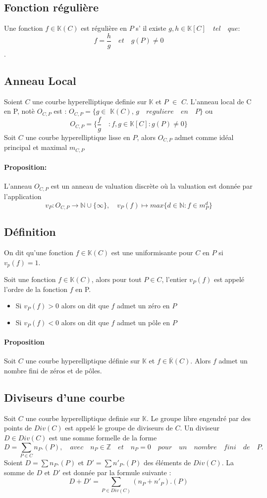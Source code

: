 \documentclass[12pt,a4paper]{article}
\begin{document}
	\subsection{Fonction régulière}
	Une fonction $f \in \mathbb{K}(C)$ est régulière en $P$ s' il existe $ g, h \in \mathbb{K}[C]\quad tel \quad que:\quad $ \[ f = \frac{h}{g}\quad et \quad g(P) \neq 0 \].
	\subsection{Anneau Local}
	Soient $C$ une courbe hyperelliptique definie sur $\mathbb{K}$ et $P$ $\in$ $C$. L'anneau local de C en P, not\`e $O_{C,P}$ est : $O_{C,P} = \{{g} \in $ $\mathbb{K}(C)$, $g \quad reguliere\quad en\quad P \}$ ou 
	\[
		O_{C,P} = \{ \frac{f}{g}\quad :f, g \in \mathbb{K}[C]: g(P) \neq 0 \} 
	\]
	Soit $C$ une courbe hyperelliptique lisse en $P$, alors $O_{C,P}$ admet comme idéal principal et maximal $m_{C,P}$ 
	\paragraph{Proposition:}
	L'anneau $O_{C,P}$ est un anneau de valuation discrète o\`u la valuation est donn\'ee par l'application
	\[
	v_P: O_{C,P} \rightarrow \mathbb{N} \cup \{\infty\}, \quad v_P(f) \mapsto max\{d \in \mathbb{N}: f \in m^d_P \}
	\]
	\subsection{Définition}
	On dit qu'une fonction $f \in \mathbb{K}(C)$ est une uniformisante pour $C$ en $P$ si $v_p(f) = 1$.
	
	Soit une fonction $f \in \mathbb{K}(C)$, alors pour tout $P \in C$, l'entier $v_P(f)$ est appelé l'ordre de la fonction $f$ en P.
	\begin{itemize}
		\item Si $v_P(f) > 0$ alors on dit que $f$ admet un z\'ero en $P$
		\item Si $v_P(f) < 0$ alors on dit que $f$ admet un p\^ole en $P$
	\end{itemize}  
	\paragraph{Proposition}
	Soit $C$ une courbe hyperelliptique d\'efinie sur $\mathbb{K}$ et $f \in \overline{\mathbb{K}}(C)$. Alors $f$ admet un nombre fini de zéros et de p\^oles.
	\subsection{Diviseurs d'une courbe}                                                                        
	Soit $C$ une courbe hyperelliptique definie sur $\mathbb{K}$. Le groupe libre engendr\'e par des points de $Div(C)$ est appelé le groupe de diviseurs de $C$. Un diviseur $D \in Div(C)$ est une somme formelle de la forme 
	\[
	D = \sum_{P \in C} n_P.(P),\quad avec\quad n_P \in \mathbb{Z}\quad et\quad n_P = 0\quad pour\quad un \quad nombre\quad fini\quad de\quad P.
	\]  
	Soient $D = \sum n_P.(P)$ et $D' = \sum n'_P.(P)$ des éléments de $Div(C)$. La somme de $D$ et $D'$ est donn\'ee par la formule suivante :
	\[
	D + D' = \sum_{P \in Div(C)} (n_P + n'_P).(P)
	\]
\end{document}
